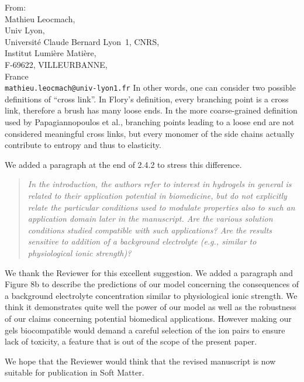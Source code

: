 \documentclass[a4paper, parskip=true, firsthead=false, fromemail=true, foldmarks=false]{scrlttr2}
\newenvironment{quotationi}
{\begin{quotation}\itshape}
{\end{quotation}}
\newcommand{\journal}{Soft Matter}
\begin{document}
\begin{letter}{From:\\
Mathieu Leocmach,\\
Univ Lyon,\\ 
Universit\'e Claude Bernard Lyon~1, CNRS,\\
Institut Lumi\`ere Mati\`ere,\\
F-69622, VILLEURBANNE,\\
France\\
\texttt{mathieu.leocmach@univ-lyon1.fr}
}
In other words, one can consider two possible definitions of ``cross link''. In Flory's definition, every branching point is a cross link, therefore a brush has many loose ends. In the more coarse-grained definition used by Papagiannopoulos et al., branching points leading to a loose end are not considered meaningful cross links, but every monomer of the side chains actually contribute to entropy and thus to elasticity.

We added a paragraph at the end of 2.4.2 to stress this difference.


\begin{quotationi}
In the introduction, the authors refer to interest in hydrogels in general is related to their application potential in biomedicine, but do not explicitly relate the particular conditions used to modulate properties also to such an application domain later in the manuscript. Are the various solution conditions studied compatible with such applications? Are the results sensitive to addition of a background electrolyte (e.g., similar to physiological ionic strength)?
\end{quotationi}

We thank the Reviewer for this excellent suggestion. We added a paragraph and Figure 8b to describe the predictions of our model concerning the consequences of a background electrolyte concentration similar to physiological ionic strength. We think it demonstrates quite well the power of our model as well as the robustness of our claims concerning potential biomedical applications. However making our gels biocompatible would demand a careful selection of the ion pairs to ensure lack of toxicity, a feature that is out of the scope of the present paper.





We hope that the Reviewer would think that the revised manuscript is now suitable for publication in \journal. 


\end{letter} 
\end{document}
